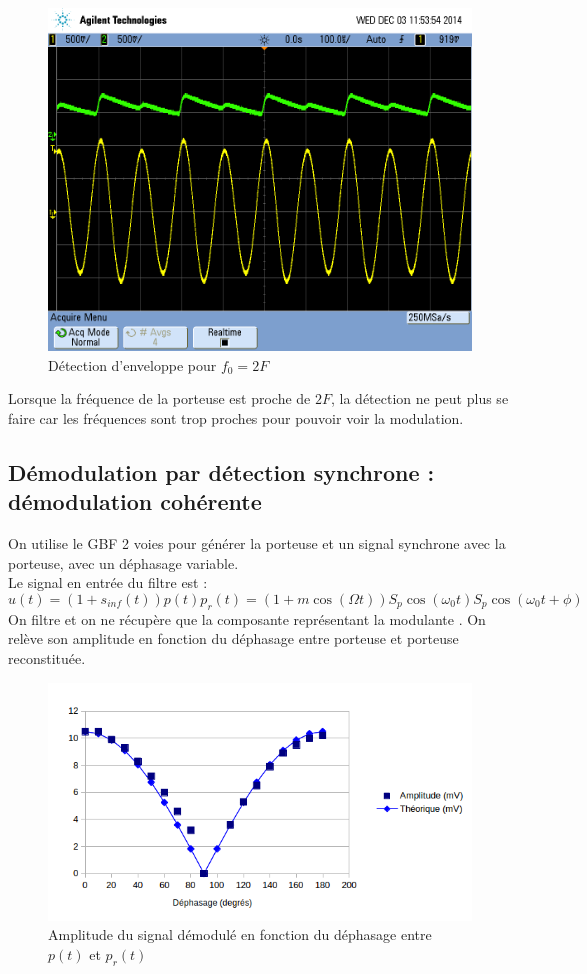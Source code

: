 \documentclass[../../Cours_M1.tex]{subfiles}
\begin{document}
\begin{figure}[h!]
\centering
\includegraphics[scale=0.2]{DE2F.png}
\caption{Détection d'enveloppe pour $f_0=2F$}
\end{figure}

Lorsque la fréquence de la porteuse est proche de $2F$, la détection ne peut plus se faire car les fréquences sont trop proches pour pouvoir voir la modulation. 

\newpage
\subsection{Démodulation par détection synchrone : démodulation cohérente}

On utilise le GBF 2 voies pour générer la porteuse et un signal synchrone avec la porteuse, avec un déphasage variable.\\

Le signal en entrée du filtre est :
\[u(t)  = (1+s_{inf}(t))p(t)p_r(t)  = (1+m\cos(\Omega t))S_p\cos(\omega_0 t)S_p\cos(\omega_0 t + \phi) \]
On filtre et on ne récupère que la composante représentant la modulante . On relève son amplitude en fonction du déphasage entre porteuse et porteuse reconstituée.

\begin{figure}[h!]
\centering
\includegraphics[scale=0.8]{Graphe.png}
\caption{Amplitude du signal démodulé en fonction du déphasage entre $p(t)$ et $p_r(t)$}
\end{figure}
\end{document}
